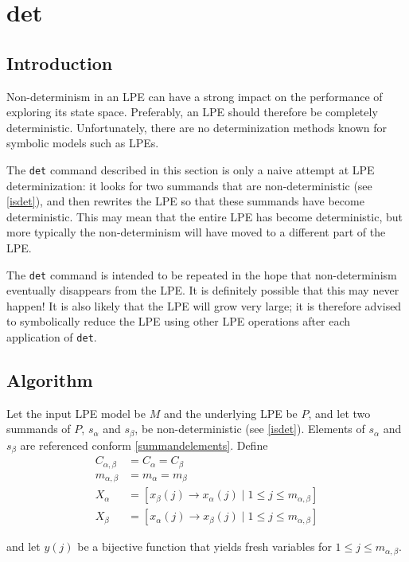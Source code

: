 \chapter{det}

\section{Introduction}

Non-determinism in an LPE can have a strong impact on the performance of exploring its state space.
Preferably, an LPE should therefore be completely deterministic.
Unfortunately, there are no determinization methods known for symbolic models such as LPEs.

The \texttt{det} command described in this section is only a naive attempt at LPE determinization: it looks for two summands that are non-deterministic (see \ref{isdet}), and then rewrites the LPE so that these summands have become deterministic.
This may mean that the entire LPE has become deterministic, but more typically the non-determinism will have moved to a different part of the LPE.

The \texttt{det} command is intended to be repeated in the hope that non-determinism eventually disappears from the LPE.
It is definitely possible that this may never happen!
It is also likely that the LPE will grow very large; it is therefore advised to symbolically reduce the LPE using other LPE operations after each application of \texttt{det}.

\section{Algorithm}

Let the input LPE model be $M$ and the underlying LPE be $P$, and let two summands of $P$, $s_\alpha$ and $s_\beta$, be non-deterministic (see \ref{isdet}).
Elements of $s_\alpha$ and $s_\beta$ are referenced conform \ref{summandelements}.
Define
\begin{align*}
C_{\alpha,\beta} &= C_\alpha = C_\beta \\
m_{\alpha,\beta} &= m_\alpha = m_\beta \\
X_\alpha &= [ x_\beta(j) \rightarrow x_\alpha(j) \;|\; 1 \leq j \leq m_{\alpha,\beta} ] \\
X_\beta &= [ x_\alpha(j) \rightarrow x_\beta(j) \;|\; 1 \leq j \leq m_{\alpha,\beta} ]
\end{align*}

and let $y(j)$ be a bijective function that yields fresh variables for $1 \leq j \leq m_{\alpha,\beta}$.

